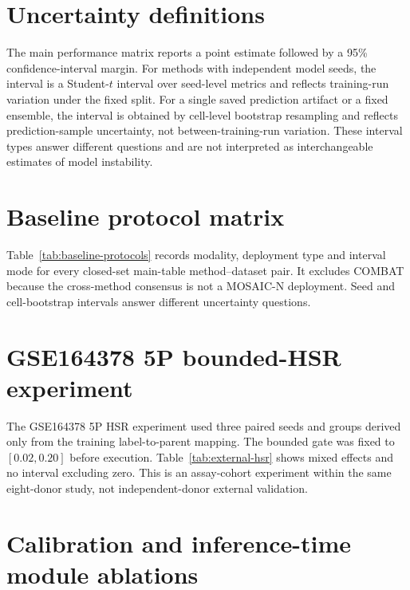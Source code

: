 \documentclass[10pt]{article}
\begin{document}
\section{Uncertainty definitions}

The main performance matrix reports a point estimate followed by a 95\% confidence-interval margin. For methods with independent model seeds, the interval is a Student-$t$ interval over seed-level metrics and reflects training-run variation under the fixed split. For a single saved prediction artifact or a fixed ensemble, the interval is obtained by cell-level bootstrap resampling and reflects prediction-sample uncertainty, not between-training-run variation. These interval types answer different questions and are not interpreted as interchangeable estimates of model instability.

\section{Baseline protocol matrix}

Table~\ref{tab:baseline-protocols} records modality, deployment type and interval mode for every closed-set main-table method--dataset pair. It excludes COMBAT because the cross-method consensus is not a MOSAIC-N deployment. Seed and cell-bootstrap intervals answer different uncertainty questions.



\section{GSE164378 5P bounded-HSR experiment}

The GSE164378 5P HSR experiment used three paired seeds and groups derived only from the training label-to-parent mapping. The bounded gate was fixed to $[0.02,0.20]$ before execution. Table~\ref{tab:external-hsr} shows mixed effects and no interval excluding zero. This is an assay-cohort experiment within the same eight-donor study, not independent-donor external validation.

\begin{table}[H]
\centering
\caption{Paired GSE164378 base and bounded-HSR results.}
\label{tab:external-hsr}
\small

\end{table}

\section{Calibration and inference-time module ablations}
\end{document}
